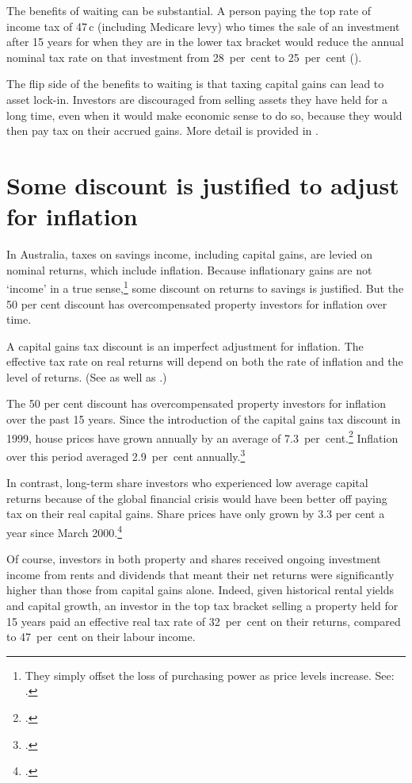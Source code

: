 The benefits of waiting can be substantial. A person paying the top rate of income tax of 47\,c (including Medicare levy) who times the sale of an investment after 15 years for when they are in the lower tax bracket would reduce the annual nominal tax rate on that investment from 28~per~cent to 25~per~cent ().

The flip side of the benefits to waiting is that taxing capital gains can lead to asset lock-in. Investors are discouraged from selling assets they have held for a long time, even when it would make economic sense to do so,  because they would then pay tax on their accrued gains. More detail is provided in .  


\section{Some discount is justified to adjust for inflation}
In Australia, taxes on savings income, including capital gains, are levied on nominal returns, which include inflation. Because inflationary gains are not `income' in a true sense,\footnote{They simply offset the loss of purchasing power as price levels increase. See: \textcite[][58]{Treasury2015ReThink}.}  some discount on returns to savings is justified. But the 50 per cent discount has overcompensated property investors for inflation over time. 

A capital gains tax discount is an imperfect adjustment for inflation. The effective tax rate on real returns will depend on both the rate of inflation and the level of returns. (See  as well as  .)

The 50 per cent discount has overcompensated property investors for inflation over the past 15 years. Since the introduction of the capital gains tax discount in 1999, house prices have grown annually by an average of 7.3~per~cent.\footcite{ABS2015HousingFinance} Inflation over this period averaged 2.9~per~cent annually.\footcite{ABSVariousyearsCPI}

In contrast, long-term share investors who experienced low average capital returns because of the global financial crisis would have been better off paying tax on their real capital gains. Share prices have only grown by 3.3 per cent a year since March 2000.\footcite{Finance2015}

Of course, investors in both property and shares received ongoing investment income from rents and dividends that meant their net returns were significantly higher than those from capital gains alone. Indeed, given historical rental yields and capital growth, an investor in the top tax bracket selling a property held for 15 years paid an effective real tax rate of 32~per~cent on their returns, compared to 47~per~cent on their labour income.

